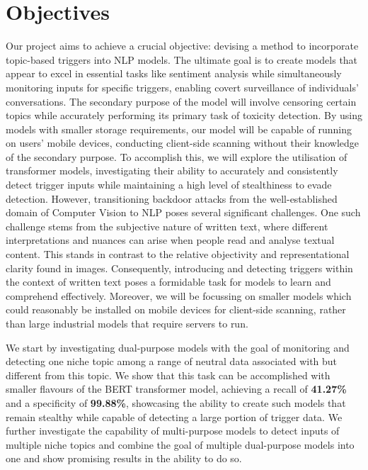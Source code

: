 \section{Objectives}

Our project aims to achieve a crucial objective: devising a method to incorporate topic-based triggers into NLP models. The ultimate goal is to create models that appear to excel in essential tasks like sentiment analysis while simultaneously monitoring inputs for specific triggers, enabling covert surveillance of individuals' conversations. The secondary purpose of the model will involve censoring certain topics while accurately performing its primary task of toxicity detection. By using models with smaller storage requirements, our model will be capable of running on users' mobile devices, conducting client-side scanning without their knowledge of the secondary purpose. To accomplish this, we will explore the utilisation of transformer models, investigating their ability to accurately and consistently detect trigger inputs while maintaining a high level of stealthiness to evade detection. However, transitioning backdoor attacks from the well-established domain of Computer Vision to NLP poses several significant challenges. One such challenge stems from the subjective nature of written text, where different interpretations and nuances can arise when people read and analyse textual content. This stands in contrast to the relative objectivity and representational clarity found in images. Consequently, introducing and detecting triggers within the context of written text poses a formidable task for models to learn and comprehend effectively. Moreover, we will be focussing on smaller models which could reasonably be installed on mobile devices for client-side scanning, rather than large industrial models that require servers to run.

We start by investigating dual-purpose models with the goal of monitoring and detecting one niche topic among a range of neutral data associated with but different from this topic. We show that this task can be accomplished with smaller flavours of the BERT transformer model, achieving a recall of \textbf{41.27\%} and a specificity of \textbf{99.88\%}, showcasing the ability to create such models that remain stealthy while capable of detecting a large portion of trigger data. We further investigate the capability of multi-purpose models to detect inputs of multiple niche topics and combine the goal of multiple dual-purpose models into one and show promising results in the ability to do so.

